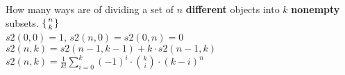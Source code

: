 How many ways are of dividing a set of $n$ \textbf{different} objects into $k$ \textbf{nonempty} subsets. $\{{n \atop k} \}$\\

$s2(0, 0) = 1$, $s2(n, 0) = s2(0, n) = 0$ \\
$s2(n, k) = s2(n -1,k-1) + k \cdot s2(n-1, k)$ \\

$s2(n, k) = \frac{1}{k!} \sum_{i=0}^{k} (-1)^{i} \cdot {\binom {k}{i}} \cdot (k-i)^{n}$ \\
  